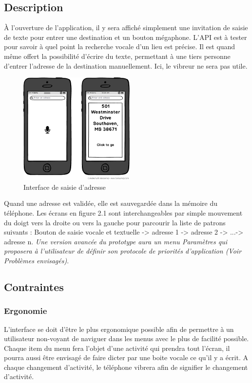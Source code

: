 \documentclass[12pt]{report}
\begin{document}
\subsection{Description}
\`A l'ouverture de l'application, il y sera affiché simplement une invitation de saisie de texte pour entrer une destination et un bouton mégaphone. L'API est à tester pour savoir à quel point la recherche vocale d'un lieu est précise. Il est quand même offert la possibilité d'écrire du texte, permettant à une tiers personne d'entrer l'adresse de la destination manuellement. Ici, le vibreur ne sera pas utile.\newline 

\begin{figure}[ht]
\begin{center}
\includegraphics[]{first.png}
\caption{Interface de saisie d'adresse}
\end{center}
\end{figure}

Quand une adresse est validée, elle est sauvegardée dans la mémoire du téléphone. Les écrans en figure 2.1 sont interchangeables par simple mouvement du doigt vers la droite ou vers la gauche pour parcourir la liste de patrons suivants : Bouton de saisie vocale et textuelle -> adresse 1 -> adresse 2 -> ...\newpage -> adresse n. \emph{Une version avancée du prototype aura un menu Paramètres qui proposera à l'utilisateur de définir son protocole de priorités d'application (Voir Problèmes envisagés)}.

\subsection{Contraintes}

\subsubsection{Ergonomie}
L'interface se doit d'être le plus ergonomique possible afin de permettre à un utilisateur non-voyant de naviguer dans les menus avec le plus de facilité possible. Chaque item du menu fera l'objet d'une activité qui prendra tout l'écran, il pourra aussi être envisagé de faire dicter par une boite vocale ce qu'il y a écrit. A chaque changement d'activité, le téléphone vibrera afin de signifier le changement d'activité.
\end{document}

